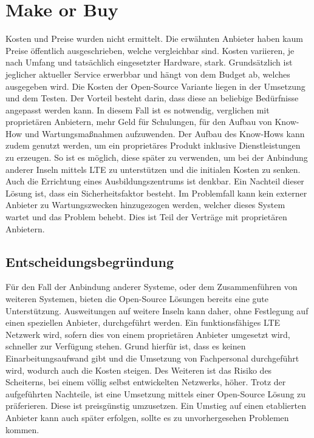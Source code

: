 
%
%
% 
% 
% 

\section{Make or Buy}
\label{sec:make_buy}

Kosten und Preise wurden nicht ermittelt. Die erwähnten Anbieter haben kaum Preise öffentlich ausgeschrieben, welche vergleichbar sind. Kosten variieren, je nach Umfang und tatsächlich eingesetzter Hardware, stark. Grundsätzlich ist jeglicher aktueller Service erwerbbar und hängt von dem Budget ab, welches ausgegeben wird. Die Kosten der Open-Source Variante liegen in der Umsetzung und dem Testen. Der Vorteil besteht darin, dass diese an beliebige Bedürfnisse angepasst werden kann. In diesem Fall ist es notwendig, verglichen mit proprietären Anbietern, mehr Geld für Schulungen, für den Aufbau von Know-How und Wartungsmaßnahmen aufzuwenden. Der Aufbau des Know-Hows kann zudem genutzt werden, um ein proprietäres Produkt inklusive Dienstleistungen zu erzeugen. So ist es möglich, diese später zu verwenden, um bei der Anbindung anderer Inseln mittels LTE zu unterstützen und die initialen Kosten zu senken. Auch die Errichtung eines Ausbildungszentrums ist denkbar. Ein Nachteil dieser Lösung ist, dass ein Sicherheitsfaktor besteht. Im Problemfall kann kein externer Anbieter zu Wartungszwecken hinzugezogen werden, welcher dieses System wartet und das Problem behebt. Dies ist Teil der Verträge mit proprietären Anbietern.

\subsection{Entscheidungsbegründung}
Für den Fall der Anbindung anderer Systeme, oder dem Zusammenführen von weiteren Systemen, bieten die Open-Source Lösungen bereits eine gute Unterstützung. Ausweitungen auf weitere Inseln kann daher, ohne Festlegung auf einen speziellen Anbieter, durchgeführt werden. Ein funktionsfähiges LTE Netzwerk wird, sofern dies von einem proprietären Anbieter umgesetzt wird, schneller zur Verfügung stehen. Grund hierfür ist, dass es keinen Einarbeitungsaufwand gibt und die Umsetzung von Fachpersonal durchgeführt wird, wodurch auch die Kosten steigen. Des Weiteren ist das Risiko des Scheiterns, bei einem völlig selbst entwickelten Netzwerks, höher. Trotz der aufgeführten Nachteile, ist eine Umsetzung mittels einer Open-Source Lösung zu präferieren. Diese ist preisgünstig umzusetzen. Ein Umstieg auf einen etablierten Anbieter kann auch später erfolgen, sollte es zu unvorhergesehen Problemen kommen.

